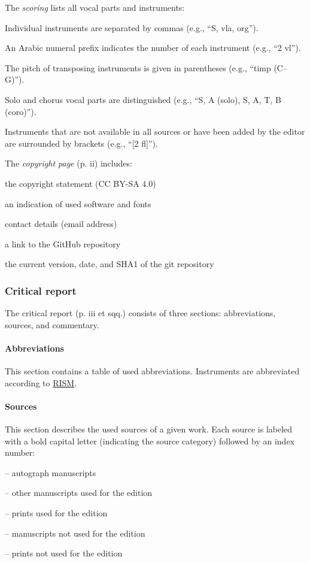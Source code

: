 \documentclass{ees}
\begin{document}
The \textit{scoring} lists all vocal parts and instruments:
\begin{bulletlist}
  \item Individual instruments are separated by commas (e.g., “S, vla, org”).
  \item An Arabic numeral prefix indicates the number of each instrument (e.g., “2 vl”).
  \item The pitch of transposing instruments is given in parentheses (e.g., “timp (C–G)”).
  \item Solo and chorus vocal parts are distinguished (e.g., “S, A (solo), S, A, T, B (coro)”).
  \item Instruments that are not available in all sources or have been added by the editor are surrounded by brackets (e.g., “[2 fl]”).
\end{bulletlist}

The \textit{copyright page} (p. ii) includes:
\begin{bulletlist}
  \item the copyright statement (CC BY-SA 4.0)
  \item an indication of used software and fonts
  \item contact details (email address)
  \item a link to the GitHub repository
  \item the current version, date, and SHA1 of the git repository
\end{bulletlist}


\subsubsection{Critical report}

The critical report (p. iii et sqq.) consists of three sections: abbreviations, sources, and commentary.

\paragraph{Abbreviations}
This section contains a table of used abbreviations. Instruments are abbreviated according to \href{https://opac.rism.info/scoring-abbreviations}{RISM}.

\paragraph{Sources}
This section describes the used sources of a given work. Each source is labeled with a bold capital letter (indicating the source category) followed by an index number:
\begin{bulletlist}
  \item \A{} – autograph manuscripts
  \item \B{} – other manuscripts used for the edition
  \item \C{} – prints used for the edition
  \item \D{} – manuscripts not used for the edition
  \item \E{} – prints not used for the edition
\end{bulletlist}
\end{document}
